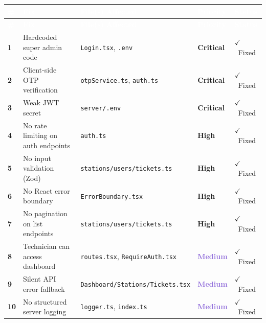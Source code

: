 \documentclass[12pt,a4paper]{report}
\newcommand{\critical}{\textcolor{criticalred}{\textbf{Critical}}}
\newcommand{\high}{\textcolor{highorange}{\textbf{High}}}
\newcommand{\medium}{\textcolor{mediumpurple}{\textbf{Medium}}}
\newcommand{\fixed}{\textcolor{greenfg}{$\checkmark$~Fixed}}
\newcommand{\file}[1]{\texttt{\small #1}}
\begin{document}
	\setlength{\tabcolsep}{6pt}
	\renewcommand{\arraystretch}{1.35}
	
	\begin{longtable}{
			>{\centering\bfseries}p{0.5cm}
			p{4.0cm}
			p{4.2cm}
			p{1.9cm}
			p{1.6cm}
		}
		\rowcolor{tablehead}
		\textcolor{white}{\#} &
		\textcolor{white}{\textbf{Fix}} &
		\textcolor{white}{\textbf{File(s) Affected}} &
		\textcolor{white}{\textbf{Priority}} &
		\textcolor{white}{\textbf{Status}} \\
		\endfirsthead
		\rowcolor{tablehead}
		\textcolor{white}{\#} &
		\textcolor{white}{\textbf{Fix}} &
		\textcolor{white}{\textbf{File(s) Affected}} &
		\textcolor{white}{\textbf{Priority}} &
		\textcolor{white}{\textbf{Status}} \\
		\endhead
		\bottomrule
		\endfoot
		
		\rowcolor{rowalt}
		1 & Hardcoded super admin code &
		\file{Login.tsx}, \file{.env} &
		\critical & \fixed \\
		
		2 & Client-side OTP verification &
		\file{otpService.ts}, \file{auth.ts} &
		\critical & \fixed \\
		
		\rowcolor{rowalt}
		3 & Weak JWT secret &
		\file{server/.env} &
		\critical & \fixed \\
		
		4 & No rate limiting on auth endpoints &
		\file{auth.ts} &
		\high & \fixed \\
		
		\rowcolor{rowalt}
		5 & No input validation (Zod) &
		\file{stations/users/tickets.ts} &
		\high & \fixed \\
		
		6 & No React error boundary &
		\file{ErrorBoundary.tsx} &
		\high & \fixed \\
		
		\rowcolor{rowalt}
		7 & No pagination on list endpoints &
		\file{stations/users/tickets.ts} &
		\high & \fixed \\
		
		8 & Technician can access dashboard &
		\file{routes.tsx}, \file{RequireAuth.tsx} &
		\medium & \fixed \\
		
		\rowcolor{rowalt}
		9 & Silent API error fallback &
		\file{Dashboard/Stations/Tickets.tsx} &
		\medium & \fixed \\
		
		10 & No structured server logging &
		\file{logger.ts}, \file{index.ts} &
		\medium & \fixed \\
		

\end{longtable}
\end{document}
